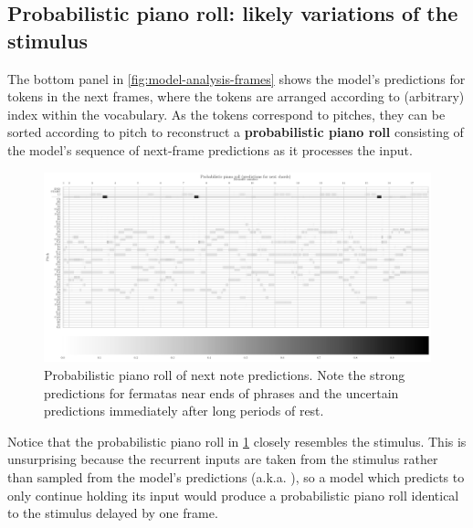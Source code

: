 \subsection{Probabilistic piano roll: likely variations of the stimulus}

The bottom panel in \cref{fig:model-analysis-frames} shows the model's predictions
for tokens in the next frames, where the tokens are arranged according to (arbitrary)
index within the vocabulary. As the tokens correspond to pitches, they can be sorted
according to pitch to reconstruct a {\bf probabilistic piano roll}\citep{eck2008learning}
consisting of the model's sequence of next-frame predictions as it processes the input.

\begin{figure}[tb]
    \centering
    \includegraphics[trim={0 0 0 1.4cm},clip,width=1.0\linewidth]{model-analysis-probabilistic-piano-roll.pdf}
    \caption{Probabilistic piano roll of next note predictions. Note the strong predictions
    for fermatas near ends of phrases and the uncertain predictions immediately
    after long periods of rest.}
    \label{fig:model-analysis-probabilistic-piano-roll}
\end{figure}

Notice that the probabilistic piano roll in
\cref{fig:model-analysis-probabilistic-piano-roll} closely resembles the
stimulus. This is unsurprising because the recurrent inputs are taken from the
stimulus rather than sampled from the model's predictions (a.k.a.
\citep{williams1989learning}), so a model which predicts to only continue holding
its input would produce a probabilistic piano roll identical to the stimulus
delayed by one frame.

